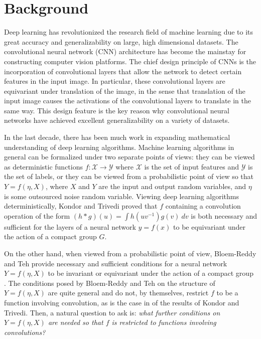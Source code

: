 

\section{Background}
Deep learning has revolutionized the research field of machine learning due to its great accuracy and generalizability on large, high dimensional datasets. 
The convolutional neural network (CNN) architecture has become the mainstay for constructing computer vision platforms. 
The chief design principle of CNNs is the incorporation of convolutional layers that allow the network to detect certain features in the input
image. 
In particular, these convolutional layers are equivariant under translation of the image, in the sense that translation of the input image causes the activations of the convolutional layers to translate in the same way. 
This design feature is the key reason why convolutional neural networks have achieved excellent generalizability on a variety of datasets.

In the last decade, there has been much work in expanding mathematical understanding of deep learning algorithms. 
Machine learning algorithms in general can be formalized under two separate points of views: they can be viewed as deterministic functions $f : \mathcal{X} \to \mathcal{Y}$ where $\mathcal{X}$ is the set of input features and $\mathcal{Y}$ is the set of labels, or they can be viewed from a probabilistic point of view so that $Y = f(\eta,X)$, where $X$ and $Y$ are the input and output random variables, and $\eta$ is some outsourced noise random variable.
Viewing deep learning algorithms deterministically, Kondor and Trivedi proved that $f$ containing a convolution operation of the form $(h * g)(u) = \int h(uv^{-1})g(v)\ dv$ is both necessary and sufficient for the layers of a neural network
$y = f(x)$ to be equivariant under the action of a compact group $G$\cite{kondor2018generalization}. 

On the other hand, when viewed from a probabilistic point of view, Bloem-Reddy and Teh provide necessary and sufficient conditions for a neural network $Y = f(\eta,X)$ to be invariant or equivariant under the action of a compact group \cite{bloemreddy2019probabilistic}.
The conditions posed by Bloem-Reddy and Teh on the structure of $Y = f(\eta, X)$ are quite general and do not, by themselves, restrict $f$ to be a function involving convolution, as is the case in of the results of Kondor and Trivedi. 
Then, a natural question to ask is: \textit{what further conditions on $Y = f(\eta, X)$ are needed so that $f$ is restricted to functions involving convolutions?}

